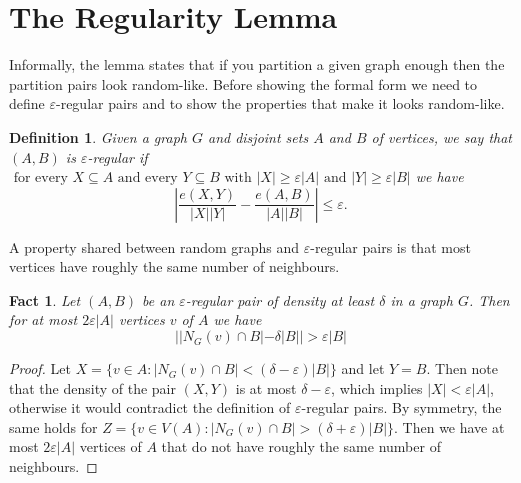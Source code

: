 \documentclass[12pt,twoside,a4paper,bibliography=totocnumbered]{book}
\numberwithin{equation}{section}
\newtheorem{definition}	[theorem] {Definition}
\newtheorem{fact}	[theorem] {Fact}
\theoremstyle{remark}
\begin{document}
\section{The Regularity Lemma}

Informally, the lemma states that if you partition a given graph enough then the partition pairs look random-like. Before showing the formal form we need to define $\varepsilon$-regular pairs and to show the properties that make it looks random-like.

\begin{definition}
Given a graph $G$ and disjoint sets $A$ and $B$ of vertices, we say that $(A,B)$ is $\varepsilon$-\emph{regular} if $\text{ for every } X \subseteq A \text{ and every } Y \subseteq B\text{ with } |X| \geq \varepsilon|A| \text{ and } |Y| \geq \varepsilon |B|$ we have
$$ \left| \frac{e(X,Y)}{|X||Y|} - \frac{e(A,B)}{|A||B|} \right| \leq \varepsilon  .$$
\end{definition}


A property shared between random graphs and $\varepsilon$-regular pairs is that most vertices have roughly the same number of neighbours.

\begin{fact}\label{fact:503}
Let $(A,B)$ be an $\varepsilon$-regular pair of density at least $\delta$ in a graph $G$. Then for at most $2 \varepsilon |A| $ vertices $v$ of $A$ we have $$||N_G(v) \cap B| - \delta|B|| > \varepsilon |B|$$
\end{fact}
\begin{proof}
Let $X = \{v \in A \colon | N_G(v) \cap B | < (\delta-\varepsilon)|B|\}$ and let $Y=B$. Then note that the density of the pair $(X,Y)$ is at most  $\delta - \varepsilon$, which implies $|X| < \varepsilon |A|$, otherwise it would contradict the definition of $\varepsilon$-regular pairs. By symmetry, the same holds for $Z = \{ v \in V(A) \colon |N_G(v) \cap B| > (\delta+\varepsilon)|B|\}$. Then we have at most $2 \varepsilon |A| $ vertices of $A$ that do not have roughly the same number of neighbours.
\end{proof}
\end{document}

